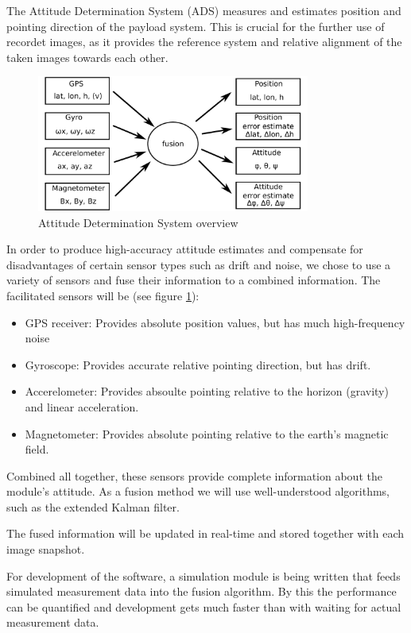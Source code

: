 The Attitude Determination System (ADS) measures and estimates position and pointing direction of the payload system.
This is crucial for the further use of recordet images, as it provides the reference system and relative alignment of the taken images towards each other.
\begin{figure}
\centering
\includegraphics[width=0.8\textwidth]{figures/ADS_diagram.pdf}
\caption{Attitude Determination System overview}
\label{fig:ADS_overview}
\end{figure}

In order to produce high-accuracy attitude estimates and compensate for disadvantages of certain sensor types such as drift and noise, we chose to use a variety of sensors and fuse their information to a combined information.
The facilitated sensors will be (see figure \ref{fig:ADS_overview}):
\begin{itemize}
\item GPS receiver: Provides absolute position values, but has much high-frequency noise
\item Gyroscope: Provides accurate relative pointing direction, but has drift.
\item Accerelometer: Provides absoulte pointing relative to the horizon (gravity) and linear acceleration.
\item Magnetometer: Provides absolute pointing relative to the earth's magnetic field.
\end{itemize}

Combined all together, these sensors provide complete information about the module's attitude.
As a fusion method we will use well-understood algorithms, such as the extended Kalman filter.

The fused information will be updated in real-time and stored together with each image snapshot.

For development of the software, a simulation module is being written that feeds simulated measurement data into the fusion algorithm.
By this the performance can be quantified and development gets much faster than with waiting for actual measurement data. 

